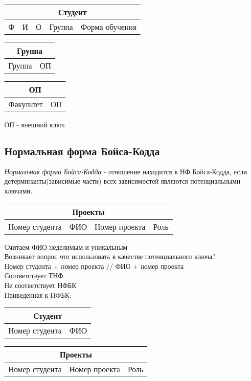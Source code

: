 \documentclass[12pt, a4paper]{article}
\begin{document}
\begin{center}
    \begin{tabular}{|c|c|c|c|c|}
         \hline \multicolumn{5}{|c|}{Студент}\\
         \hline Ф & И & О & Группа & Форма обучения\\
         \hline
    \end{tabular}
    \begin{tabular}{|c|c|}
         \hline \multicolumn{2}{|c|}{Группа} \\
         \hline Группа & ОП \\
         \hline
    \end{tabular}
    \begin{tabular}{|c|c|}
         \hline \multicolumn{2}{|c|}{ОП} \\
         \hline Факультет & ОП \\
         \hline
    \end{tabular}
\end{center}

ОП - внешний ключ

\subsection{Нормальная форма Бойса-Кодда}

\emph{Нормальная форма Бойса-Кодда} - отношение находится в НФ Бойса-Кодда, если детерминанты(зависимые части) всех зависимостей являются потенциальными ключами.

\begin{center}
    \begin{tabular}{|c|c|c|c|}
         \hline \multicolumn{4}{|c|}{Проекты} \\
         \hline Номер студента & ФИО & Номер проекта & Роль \\
         \hline
    \end{tabular}
\end{center}

Считаем ФИО неделимым и уникальным \\
Возникает вопрос что использовать в качестве потенциального ключа? \\
Номер студента + номер проекта // ФИО + номер проекта \\
Соответствует ТНФ\\
Не соответствует НФБК \\

Приведенная к НФБК:

\begin{center}
    \begin{tabular}{|c|c|}
         \hline \multicolumn{2}{|c|}{Студент} \\
         \hline Номер студента & ФИО \\
         \hline
    \end{tabular}
    \begin{tabular}{|c|c|c|}
         \hline \multicolumn{3}{|c|}{Проекты} \\
         \hline Номер студента & Номер проекта & Роль \\
         \hline
    \end{tabular}
\end{center}
\end{document}
